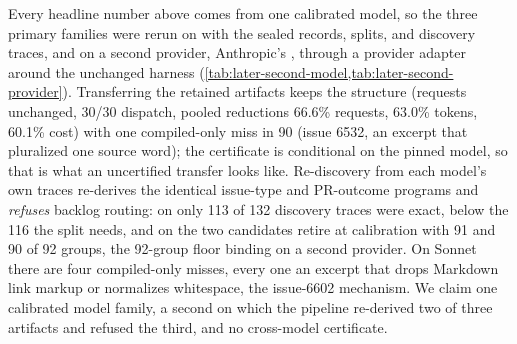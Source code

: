 Every headline number above comes from one calibrated model, so the three primary families
were rerun on  with the sealed records, splits, and discovery traces, and
on a second provider, Anthropic's , through a provider adapter around
the unchanged harness (\cref{tab:later-second-model,tab:later-second-provider}). Transferring the retained
 artifacts keeps the structure (requests unchanged, 30/30 dispatch, pooled
reductions 66.6\% requests, 63.0\% tokens, 60.1\% cost) with one compiled-only miss in 90
(issue 6532, an excerpt that pluralized one source word); the certificate is conditional on
the pinned model, so that is what an uncertified transfer looks like. Re-discovery from each
model's own traces re-derives the identical issue-type and PR-outcome programs and
\emph{refuses} backlog routing: on  only 113 of 132 discovery traces were
exact, below the 116 the split needs, and on  the two candidates
retire at calibration with 91 and 90 of 92 groups, the 92-group floor binding on a second
provider. On Sonnet there are four compiled-only misses, every one an excerpt that drops
Markdown link markup or normalizes whitespace, the issue-6602 mechanism. We claim one
calibrated model family, a second on which the pipeline re-derived two of three artifacts
and refused the third, and no cross-model certificate.

\begin{table}[t]
  \centering
  \caption{Same-cohort transfer to : retained artifacts recompiled under
  the new model pin (design B) and the pipeline rerun on the second model's own traces
  (design A). Reductions are against the same-model baseline.}
  \label{tab:later-second-model}
  \footnotesize
  \setlength{\tabcolsep}{3pt}
  \resizebox{\ifdim\width>\columnwidth\columnwidth\else\width\fi}{!}{}
\end{table}

\begin{table}[t]
  \centering
  \caption{Second provider, design A: Anthropic  on the sealed
  cohorts through the unchanged pipeline. Reductions are against the same-provider
  baseline; the backlog refusal is the 92-group floor binding.}
  \label{tab:later-second-provider}
  \footnotesize
  \setlength{\tabcolsep}{3pt}
  \resizebox{\ifdim\width>\columnwidth\columnwidth\else\width\fi}{!}{}
\end{table}

